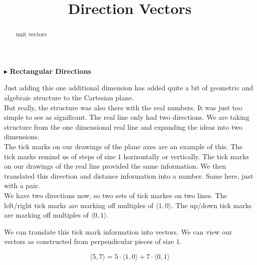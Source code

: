 \documentclass{ximera}
\title{Direction Vectors}
\begin{document}
\begin{abstract}
unit vectors
\end{abstract}
\maketitle



$\blacktriangleright$ \textbf{Rectangular Directions}

Just adding this one additional dimension has added quite a bit of geometric and algebraic structure to the Cartesian plane.  \\  


But really, the structure was also there with the real numbers.  It was just too simple to see as significant.  The real line only had two directions. We are taking structure from the one dimensional real line and expanding the ideas into two dimensions. \\ 



The tick marks on our drawings of the plane axes are an example of this. The tick marks remind us of steps of size $1$ horizontally or vertically. The tick marks on our drawings of the real line provided the same information.  We then translated this direction and distance information into a number. Same here, just with a pair.\\


We have two directions now, so two sets of tick markes on two lines.  The left/right tick marks are marking off multiples of $\langle 1, 0 \rangle$. The up/down tick marks are marking off multiples of $\langle 0, 1 \rangle$.





We can translate this tick mark information into vectors.  We can view our vectors as constructed from perpendicular pieces of size $1$.


\[ \langle 5, 7 \rangle = 5 \cdot  \langle 1, 0 \rangle + 7 \cdot \langle 0, 1 \rangle  \]
\end{document}

